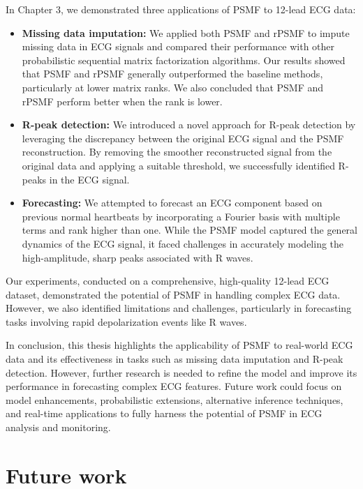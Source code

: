\documentclass{mldsmsc}
\begin{document}
\noindent In Chapter 3, we demonstrated three applications of PSMF to 12-lead ECG data:
\begin{itemize}
    \item \textbf{Missing data imputation:} We applied both PSMF and rPSMF to impute missing data in ECG signals and compared their performance with other probabilistic sequential matrix factorization algorithms. Our results showed that PSMF and rPSMF generally outperformed the baseline methods, particularly at lower matrix ranks. We also concluded that PSMF and rPSMF perform better when the rank is lower.
    \item \textbf{R-peak detection:} We introduced a novel approach for R-peak detection by leveraging the discrepancy between the original ECG signal and the PSMF reconstruction. By removing the smoother reconstructed signal from the original data and applying a suitable threshold, we successfully identified R-peaks in the ECG signal.
    \item \textbf{Forecasting:} We attempted to forecast an ECG component based on previous normal heartbeats by incorporating a Fourier basis with multiple terms and rank higher than one. While the PSMF model captured the general dynamics of the ECG signal, it faced challenges in accurately modeling the high-amplitude, sharp peaks associated with R waves.
\end{itemize}
Our experiments, conducted on a comprehensive, high-quality 12-lead ECG dataset, demonstrated the potential of PSMF in handling complex ECG data. However, we also identified limitations and challenges, particularly in forecasting tasks involving rapid depolarization events like R waves. \newline

\noindent In conclusion, this thesis highlights the applicability of PSMF to real-world ECG data and its effectiveness in tasks such as missing data imputation and R-peak detection. However, further research is needed to refine the model and improve its performance in forecasting complex ECG features. Future work could focus on model enhancements, probabilistic extensions, alternative inference techniques, and real-time applications to fully harness the potential of PSMF in ECG analysis and monitoring.

\section{Future work}
\end{document}
